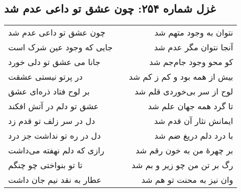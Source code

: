 \begin{center}
\section*{غزل شماره ۲۵۴: چون عشق تو داعی عدم شد}
\label{sec:254}
\begin{longtable}{l p{0.5cm} r}
چون عشق تو داعی عدم شد
&&
نتوان به وجود متهم شد
\\
جایی که وجود عین شرک است
&&
آنجا نتوان مگر عدم شد
\\
جانا می عشق تو دلی خورد
&&
کو محو وجود جام‌جم شد
\\
در پرتو نیستی عشقت
&&
بیش از همه بود و کم ز کم شد
\\
بر لوح فتاد ذره‌ای عشق
&&
لوح از سر بی‌خوردی قلم شد
\\
عشق تو دلم در آتش افکند
&&
تا گرد همه جهان علم شد
\\
دل در سر زلف تو قدم زد
&&
ایمانش نثار آن قدم شد
\\
دل در ره تو نداشت جز درد
&&
با درد دلم دریغ ضم شد
\\
رازی که دلم نهفته می‌داشت
&&
بر چهرهٔ من به خون رقم شد
\\
تا تو بنواختی چو چنگم
&&
رگ بر تن من چو زیر و بم شد
\\
عطار به نقد نیم جان داشت
&&
وان نیز به محنت تو هم شد
\\
\end{longtable}
\end{center}
